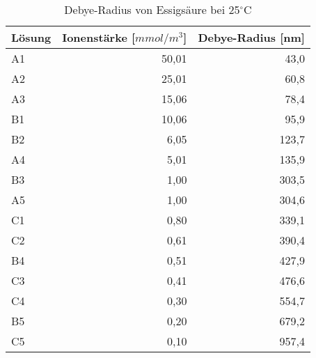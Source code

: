 \begin{table}[H]
  \centering
  \caption{Debye-Radius von Essigsäure bei 25$^\circ$C}
    \begin{tabular}{lrr}
    \toprule
    \textbf{Lösung} & \multicolumn{1}{l}{\boldmath{}\textbf{Ionenstärke [$mmol/m^3$]}\unboldmath{}} & \multicolumn{1}{l}{\textbf{Debye-Radius [nm] }} \\
    \midrule
    A1    & 50,01 & 43,0 \\
    A2    & 25,01 & 60,8 \\
    A3    & 15,06 & 78,4 \\
    B1    & 10,06 & 95,9 \\
    B2    & 6,05  & 123,7 \\
    A4    & 5,01  & 135,9 \\
    B3    & 1,00  & 303,5 \\
    A5    & 1,00  & 304,6 \\
    C1    & 0,80  & 339,1 \\
    C2    & 0,61  & 390,4 \\
    B4    & 0,51  & 427,9 \\
    C3    & 0,41  & 476,6 \\
    C4    & 0,30  & 554,7 \\
    B5    & 0,20  & 679,2 \\
    C5    & 0,10  & 957,4 \\
    \bottomrule
    \end{tabular}%
  \label{tab:addlabel}%
\end{table}%
